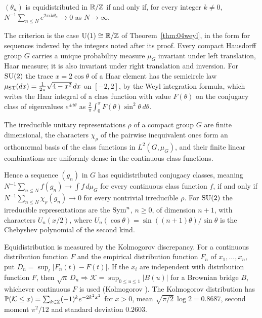 \begin{theorem}\label{thm:A:weyl}
$(\theta_n)$ is equidistributed in $\mathbb{R}/\mathbb{Z}$ if and only if, for every integer $k\ne0$, $N^{-1}\sum_{n\le N}e^{2\pi ik\theta_n}\to0$ as $N\to\infty$.
\end{theorem}

The criterion is the case $\mathrm U(1)\cong\mathbb{R}/\mathbb{Z}$ of Theorem~\ref{thm:04weyl}, in the form for sequences indexed by the integers noted after its proof. Every compact Hausdorff group $G$ carries a unique probability measure $\mu_G$ invariant under left translation, Haar measure; it is also invariant under right translation and inversion. For $\mathrm{SU}(2)$ the trace $x=2\cos\theta$ of a Haar element has the semicircle law $\mu_{\mathrm{ST}}(dx)=\tfrac1{2\pi}\sqrt{4-x^2}\,dx$ on $[-2,2]$, by the Weyl integration formula, which writes the Haar integral of a class function with value $F(\theta)$ on the conjugacy class of eigenvalues $e^{\pm i\theta}$ as $\tfrac2\pi\int_0^\pi F(\theta)\sin^2\theta\,d\theta$.

\begin{theorem}\label{thm:A:pw}
The irreducible unitary representations $\rho$ of a compact group $G$ are finite dimensional, the characters $\chi_\rho$ of the pairwise inequivalent ones form an orthonormal basis of the class functions in $L^2(G,\mu_G)$, and their finite linear combinations are uniformly dense in the continuous class functions.
\end{theorem}

Hence a sequence $(g_n)$ in $G$ has equidistributed conjugacy classes, meaning $N^{-1}\sum_{n\le N}f(g_n)\to\int f\,d\mu_G$ for every continuous class function $f$, if and only if $N^{-1}\sum_{n\le N}\chi_\rho(g_n)\to0$ for every nontrivial irreducible $\rho$. For $\mathrm{SU}(2)$ the irreducible representations are the $\operatorname{Sym}^n$, $n\ge0$, of dimension $n+1$, with characters $U_n(x/2)$, where $U_n(\cos\theta)=\sin((n+1)\theta)/\sin\theta$ is the Chebyshev polynomial of the second kind.

Equidistribution is measured by the Kolmogorov discrepancy. For a continuous distribution function $F$ and the empirical distribution function $F_n$ of $x_1,\dots,x_n$, put $D_n=\sup_t|F_n(t)-F(t)|$. If the $x_i$ are independent with distribution function $F$, then $\sqrt n\,D_n\Rightarrow\mathcal K=\sup_{0\le u\le1}|B(u)|$ for a Brownian bridge $B$, whichever continuous $F$ is used (Kolmogorov \cite{kolmogorov1933}). The Kolmogorov distribution has $\mathbb{P}(\mathcal K\le x)=\sum_{k\in\mathbb{Z}}(-1)^ke^{-2k^2x^2}$ for $x>0$, mean $\sqrt{\pi/2}\,\log2=0.8687$, second moment $\pi^2/12$ and standard deviation $0.2603$.

